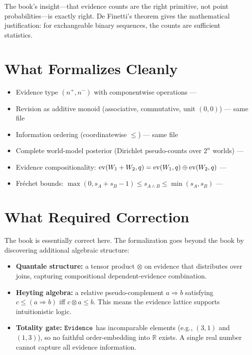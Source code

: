 \documentclass[11pt,openany]{report}
\begin{document}
The book's insight---that evidence counts are the right primitive, not
point probabilities---is exactly right.  De Finetti's theorem gives the
mathematical justification: for exchangeable binary sequences, the counts
are sufficient statistics.

\section{What Formalizes Cleanly}

\begin{itemize}
\item Evidence type $(n^+, n^-)$ with componentwise operations ---
\item Revision as additive monoid (associative, commutative, unit $(0,0)$) ---
  same file
\item Information ordering (coordinatewise $\le$) --- same file
\item Complete world-model posterior (Dirichlet pseudo-counts over $2^n$ worlds) ---
\item Evidence compositionality:
  $\mathrm{ev}(W_1 + W_2, q) = \mathrm{ev}(W_1, q) \oplus \mathrm{ev}(W_2, q)$ ---
\item Fr\'{e}chet bounds: $\max(0, s_A + s_B - 1) \le s_{A \wedge B} \le \min(s_A, s_B)$ ---
\end{itemize}

\section{What Required Correction}

The book is essentially correct here.  The formalization goes beyond
the book by discovering additional algebraic structure:
\begin{itemize}
\item \textbf{Quantale structure:} a tensor product $\otimes$ on evidence
  that distributes over joins, capturing compositional dependent-evidence
  combination.
\item \textbf{Heyting algebra:} a relative pseudo-complement
  $a \Rightarrow b$ satisfying $c \le (a \Rightarrow b)$ iff $c \otimes a \le b$.
  This means the evidence lattice supports intuitionistic logic.
\item \textbf{Totality gate:} $\mathtt{Evidence}$ has incomparable elements
  (e.g., $(3,1)$ and $(1,3)$), so no faithful order-embedding into $\mathbb{R}$
  exists.  A single real number cannot capture all evidence information.
\end{itemize}
\end{document}
